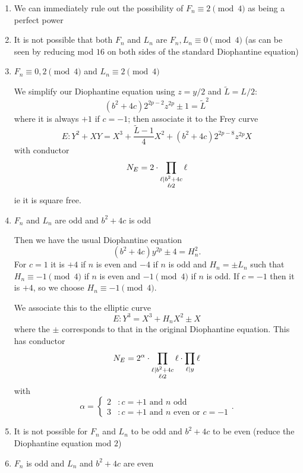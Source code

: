 \documentclass[12pt]{article}
\newcommand{\notdiv}{\nshortmid}
\begin{document}
\begin{enumerate}


\item We can immediately rule out the possibility of $F_n \equiv 2 \pmod{4}$ as being a perfect power

\item It is not possible that both $F_n$ and $L_n$ are $F_n, L_n \equiv 0 \pmod{4}$ (as can be seen by reducing mod $16$ on both sides of the standard Diophantine equation)

\item $F_n \equiv 0,2 \pmod{4}$ and $L_n \equiv 2 \pmod{4}$

We simplify our Diophantine equation using $z = y/2$ and $\tilde{L} = L/2$:
\[ (b^2+4c) 2^{2p-2} z^{2p} \pm 1 = \tilde{L}^2 \]
where it is always $+1$ if $c = -1$; then associate it to the Frey curve
\[E: Y^2 +XY = X^3 + \frac{\tilde{L} -1}{4} X^2  + (b^2+4c) 2^{2p-8} z^{2p}X \]
with conductor
\[N_E = 2 \cdot \prod_{\substack{\ell | b^2+4c \\ \ell \notdiv 2}} \ell \]
ie it is square free.

\item $F_n$ and $L_n$ are odd and $b^2+4c$ is odd

Then we have the usual Diophantine equation 
\[ (b^2+4c)y^{2p} \pm 4 = H_n^2. \]
For $c = 1$ it is $+4$ if $n$ is even and $-4$ if $n$ is odd and $H_n = \pm L_n$ such that $H_n \equiv -1\pmod{4}$ if $n$ is even and $-1 \pmod{4}$ if $n$ is odd.  If $c = -1$ then it is $+4$, so we choose $H_n \equiv -1 \pmod{4}$.


We associate this to the elliptic curve
\[ E: Y^3 = X^3 + H_n X^2 \pm X \]
where the $\pm$ corresponds to that in the original Diophantine equation.  This has conductor
\[N_E = 2^{\alpha} \cdot  \prod_{\substack{\ell | b^2+4c \\ \ell \notdiv 2}} \ell \cdot \prod_{\ell | y} \ell \]
with 
\[ \alpha = \begin{cases} 2 &: c = +1 \text{ and } n \text{ odd} \\ 3 &:   c= +1 \text{ and } n \text{ even} \text{ or } c = -1 \end{cases}. \]

\item It is not possible for $F_n$ and $L_n$ to be odd and $b^2+4c$ to be even (reduce the Diophantine equation mod $2$)

\item $F_n$ is odd and $L_n$ and $b^2+4c$ are even


\end{enumerate}
\end{document}
